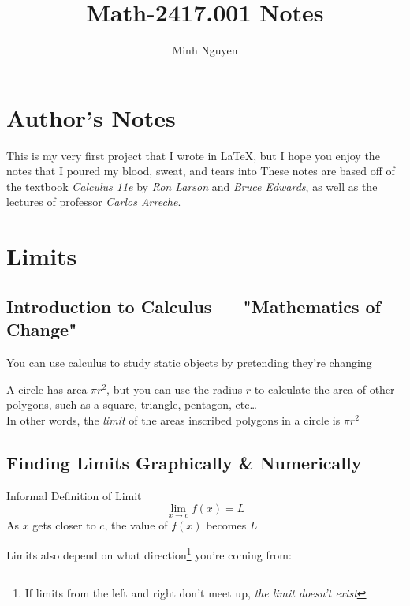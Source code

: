\documentclass{MathNotes}
\title{Math-2417.001 Notes}
\author{Minh Nguyen}
\begin{document}
\newpage
\maketitle
{}
\tableofcontents
\newpage
\section*{Author's Notes}
This is my very first project that I wrote in \LaTeX, but I hope you enjoy
the notes that I poured my blood, sweat, and tears into  
\br
These notes are based off of the textbook \textit{Calculus 11e} by 
\textit{Ron Larson} and \textit{Bruce Edwards}, as well as the lectures of 
professor \textit{Carlos Arreche}.
\newpage
{}

\section{Limits}
\subsection{Introduction to Calculus --- "Mathematics of Change"}

You can use calculus to study static objects by pretending they're changing
\\

\begin{example}{}
    A circle has area $\pi r^2$, but you can use the radius $r$ to calculate
    the area of other polygons, such as a square, triangle, pentagon, etc\dots
    \\

    In other words, the \textit{limit} of the areas inscribed polygons in a circle
    is $\pi r^2$
\end{example}

\subsection{Finding Limits Graphically \& Numerically}

\begin{theorem}{Informal Definition of Limit}
    \[\lim_{x\to c}f(x)=L\] 
    As $x$ gets closer to $c$, the value of $f(x)$ becomes $L$
\end{theorem}

Limits also depend on what direction\footnote{
    If limits from the left and right don't meet up, 
    \textit{the limit doesn't exist}
}
you're coming from:
\end{document}
